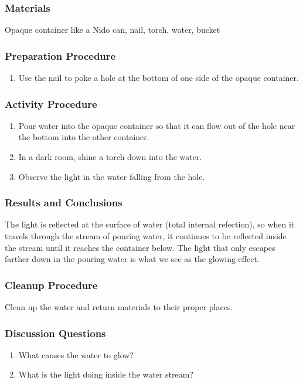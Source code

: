 \subsubsection*{Materials}
Opaque container like a Nido can, nail, torch, water, bucket

\subsubsection*{Preparation Procedure}
\begin{enumerate}
\item{Use the nail to poke a hole at the bottom of one side of the opaque container.}
\end{enumerate}

\subsubsection*{Activity Procedure}
\begin{enumerate}
\item{Pour water into the opaque container so that it can flow out of the hole near the bottom into the other container.}
\item{In a dark room, shine a torch down into the water.}
\item{Observe the light in the water falling from the hole.}
\end{enumerate}

\subsubsection*{Results and Conclusions}
The light is reflected at the surface of water (total internal refection), so when it travels through the stream of pouring water, it continues to be reflected inside the stream until it reaches the container below. The light that only escapes farther down in the pouring water is what we see as the glowing
effect.

\subsubsection*{Cleanup Procedure}
Clean up the water and return materials to their proper places.

\subsubsection*{Discussion Questions}
\begin{enumerate}
\item{What causes the water to glow?}
\item{What is the light doing inside the water stream?}
\end{enumerate}

